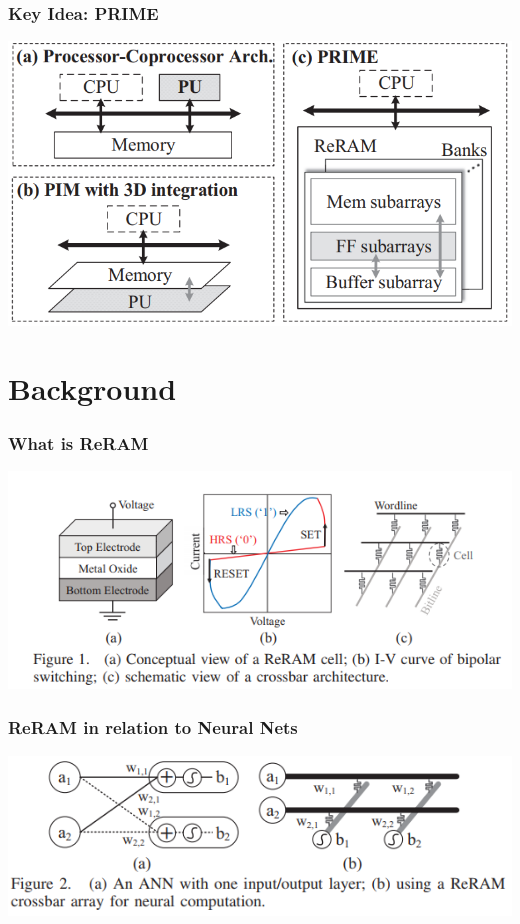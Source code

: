 \documentclass[hyperref={colorlinks}]{beamer}
\begin{document}
\begin{frame}
	\frametitle{Key Idea: PRIME}
	\includegraphics[scale=0.4]{keyIdea.png}
\end{frame}

\section{Background}
\begin{frame}
	\frametitle{What is ReRAM}
	\includegraphics[scale=0.5]{reram.png}
\end{frame}

\begin{frame}
	\frametitle{ReRAM in relation to Neural Nets}
	\includegraphics[scale=0.5]{reram_nn.png}
\end{frame}
\end{document}

